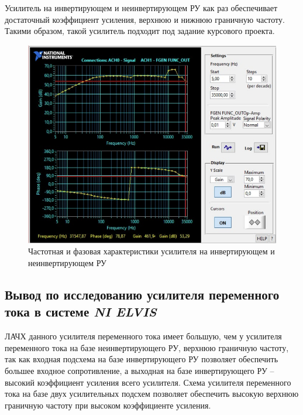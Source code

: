 Усилитель на инвертирующем и неинвертирующем РУ 
как раз обеспечивает достаточный коэффициент усиления, 
верхнюю и нижнюю граничную частоту. 
Такими образом, такой усилитель подходит 
под задание курсового проекта.

\begin{figure}[H]
	\centering
	\includegraphics[width=0.7\linewidth]{photo/elvis_sub2}
	\caption{Частотная и фазовая характеристики усилителя на инвертирующем и неинвертирующем РУ}
	\label{fig:elvis_sub2}
\end{figure}

\subsection*{Вывод по исследованию усилителя переменного тока в системе \textit{NI ELVIS}}

ЛАЧХ данного усилителя переменного тока имеет большую,
чем у усилителя переменного тока на базе неинвертирующего РУ,
верхнюю граничную частоту, так как входная подсхема на базе
инвертирующего РУ позволяет обеспечить большее
входное сопротивление, а выходная на базе 
инвертирующего РУ – высокий коэффициент усиления всего усилителя.
Схема усилителя переменного тока на базе двух усилительных
подсхем позволяет обеспечить высокую верхнюю
граничную частоту при высоком коэффициенте усиления. 
